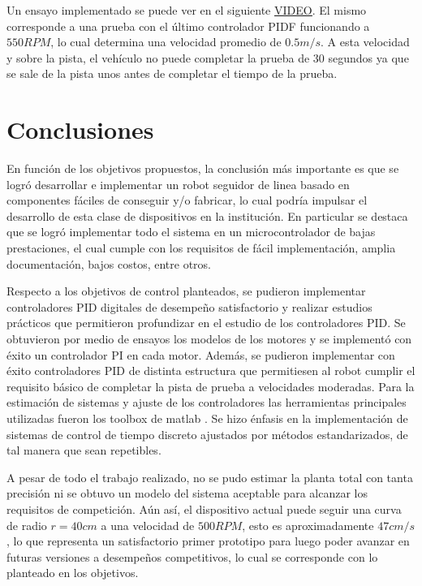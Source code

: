 \documentclass[10pt,conference,a4paper,onecolumn]{article}%
\begin{document}
Un ensayo implementado se puede ver en el siguiente \href{https://youtu.be/hJU_oneTO20}{\underline{VIDEO}}. El mismo corresponde a una prueba con el último controlador PIDF funcionando a $550RPM$, lo cual determina una velocidad promedio de $0.5m/s$. A esta velocidad y sobre la pista, el vehículo no puede completar la prueba de 30 segundos ya que se sale de la pista unos antes de completar el tiempo de la prueba. 


\section{Conclusiones}
\label{sec:conclusiones}
En función de los objetivos propuestos, la conclusión más importante es que se logró desarrollar e implementar un robot seguidor de linea basado en componentes fáciles de conseguir y/o fabricar, lo cual podría impulsar el desarrollo de esta clase de dispositivos en la institución. En particular se destaca que se logró implementar todo el sistema en un microcontrolador de bajas prestaciones, el cual cumple con los requisitos de fácil implementación, amplia documentación, bajos costos, entre otros.  

Respecto a los objetivos de control planteados, se pudieron implementar controladores PID digitales de desempeño satisfactorio y realizar estudios prácticos que permitieron profundizar en el estudio de los controladores PID.
Se obtuvieron por medio de ensayos los modelos de los motores y se implementó con éxito un controlador PI en cada motor. Además, se pudieron implementar con éxito controladores PID de distinta estructura que permitiesen al robot cumplir el requisito básico de completar la pista de prueba a velocidades moderadas.
Para la estimación de sistemas y ajuste de los controladores las herramientas principales utilizadas fueron los toolbox de matlab \cite{Sys_ident,PID_tuner}. Se hizo énfasis en la implementación de sistemas de control de tiempo discreto ajustados por métodos estandarizados, de tal manera que sean repetibles.

A pesar de todo el trabajo realizado, no se pudo estimar la planta total con tanta precisión ni se obtuvo un modelo del sistema aceptable para alcanzar los requisitos de competición. Aún así, el dispositivo actual puede seguir una curva de radio $r=40cm$ a una velocidad de $500RPM$, esto es aproximadamente $47cm/s$, lo que representa un satisfactorio primer prototipo para luego poder avanzar en futuras versiones a desempeños competitivos, lo cual se corresponde con lo planteado en los objetivos.
\end{document}
